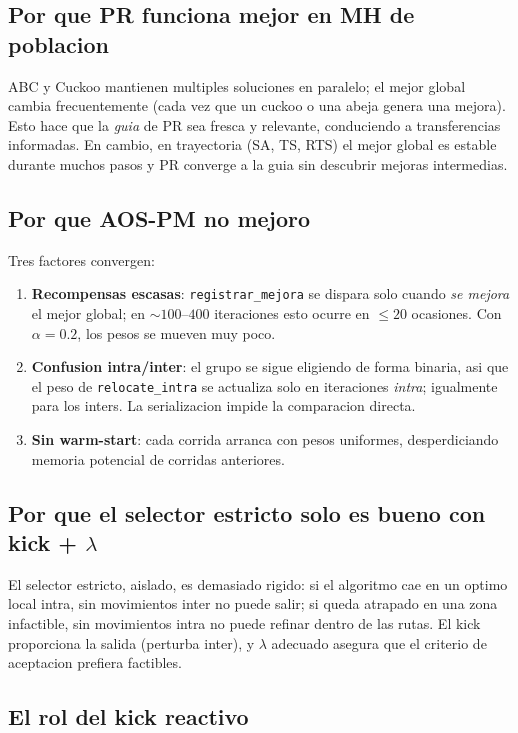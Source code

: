 \documentclass[11pt,a4paper]{article}
\newcommand{\mh}{MH}
\newcommand{\op}[1]{\texttt{#1}}
\newcommand{\code}[1]{\texttt{#1}}
\begin{document}
\subsection{Por que PR funciona mejor en \mh{} de poblacion}

ABC y Cuckoo mantienen multiples soluciones en paralelo; el mejor
global cambia frecuentemente (cada vez que un cuckoo o una abeja
genera una mejora). Esto hace que la \emph{guia} de PR sea fresca y
relevante, conduciendo a transferencias informadas. En cambio, en
trayectoria (SA, TS, RTS) el mejor global es estable durante muchos
pasos y PR converge a la guia sin descubrir mejoras intermedias.

\subsection{Por que AOS-PM no mejoro}

Tres factores convergen:
\begin{enumerate}
\item \textbf{Recompensas escasas}: \code{registrar\_mejora} se
dispara solo cuando \emph{se mejora} el mejor global; en
$\sim 100$--$400$ iteraciones esto ocurre en $\le 20$ ocasiones. Con
$\alpha=0.2$, los pesos se mueven muy poco.
\item \textbf{Confusion intra/inter}: el grupo se sigue eligiendo de
forma binaria, asi que el peso de \op{relocate\_intra} se actualiza
solo en iteraciones \emph{intra}; igualmente para los inters. La
serializacion impide la comparacion directa.
\item \textbf{Sin warm-start}: cada corrida arranca con pesos
uniformes, desperdiciando memoria potencial de corridas anteriores.
\end{enumerate}

\subsection{Por que el selector estricto solo es bueno con kick + $\lambda$}

El selector estricto, aislado, es demasiado rigido: si el algoritmo
cae en un optimo local intra, sin movimientos inter no puede salir; si
queda atrapado en una zona infactible, sin movimientos intra no puede
refinar dentro de las rutas. El kick proporciona la salida (perturba
inter), y $\lambda$ adecuado asegura que el criterio de aceptacion
prefiera factibles.

\subsection{El rol del kick reactivo}
\end{document}

